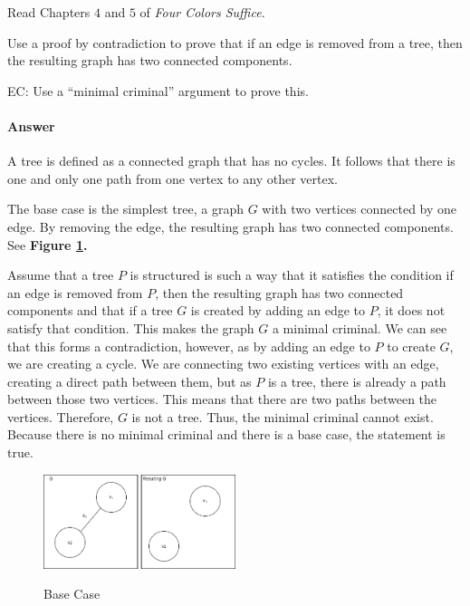\documentclass{article}
\begin{document}
 

Read Chapters $4$ and $5$ of \emph{Four Colors Suffice}.

Use a proof by contradiction to prove that if an edge is removed from a
tree, then the resulting graph has two connected components.

EC:
Use a ``minimal criminal'' argument to prove this.

        \paragraph{Answer}

	A tree is defined as a connected graph that has no cycles. It follows that there is one and only one path from one vertex to any other vertex.
	
	The base case is the simplest tree, a graph $G$ with two vertices connected by one edge. By removing the edge, the resulting graph has two connected components. See \textbf{Figure \ref{graph}.}
	
	Assume that a tree $P$ is structured is such a way that it satisfies the condition if an edge is removed from $P$, then the resulting graph has 
	two connected components and that if a tree $G$ is created by adding an edge to $P$, it does not satisfy that condition. This makes the graph $G$ a
	minimal criminal. We can see that this forms a contradiction, however, as by adding an edge to $P$ to create $G$, we are creating a cycle. We are 
	connecting two existing vertices with an edge, creating a direct path between them, but as $P$ is a tree, there is already a path between those two vertices.
	This means that there are two paths between the vertices. Therefore, $G$ is not a tree. Thus, the minimal criminal cannot exist.
	Because there is no minimal criminal and there is a base case, the statement is true.

 \begin{figure}
\caption{Base Case}
\centering
\includegraphics[width=0.5\textwidth]{images/graphBaseCase}
\label{graph}
\end{figure}
\end{document}
